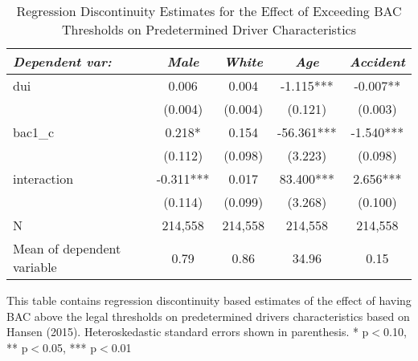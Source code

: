 \begin{table}[htbp]\centering
\small
\caption{Regression Discontinuity Estimates for the Effect of Exceeding BAC Thresholds on Predetermined Driver Characteristics}
\begin{center}
\begin{threeparttable}
\begin{tabular}{l*{4}{c}}
\toprule
\multicolumn{1}{l}{\textit{Dependent var: }}&
\multicolumn{1}{c}{\textit{Male}}&
\multicolumn{1}{c}{\textit{White}}&
\multicolumn{1}{c}{\textit{Age}}&
\multicolumn{1}{c}{\textit{Accident}}\\
\midrule
dui                 &       0.006   &       0.004   &      -1.115***&      -0.007** \\
                    &     (0.004)   &     (0.004)   &     (0.121)   &     (0.003)   \\
bac1\_c              &       0.218*  &       0.154   &     -56.361***&      -1.540***\\
                    &     (0.112)   &     (0.098)   &     (3.223)   &     (0.098)   \\
interaction         &      -0.311***&       0.017   &      83.400***&       2.656***\\
                    &     (0.114)   &     (0.099)   &     (3.268)   &     (0.100)   \\
\midrule
N                   &     214,558   &     214,558   &     214,558   &     214,558   \\
Mean of dependent variable&        0.79   &        0.86   &       34.96   &        0.15   \\
\bottomrule
\end{tabular}
\begin{tablenotes}
\tiny
\item This table contains regression discontinuity based estimates of the effect of having BAC above the legal thresholds on predetermined  drivers characteristics based on Hansen (2015).  Heteroskedastic standard errors shown in parenthesis.  * p$<$0.10, ** p$<$0.05, *** p$<$0.01
\end{tablenotes}
\end{threeparttable}
\end{center}
\end{table}

